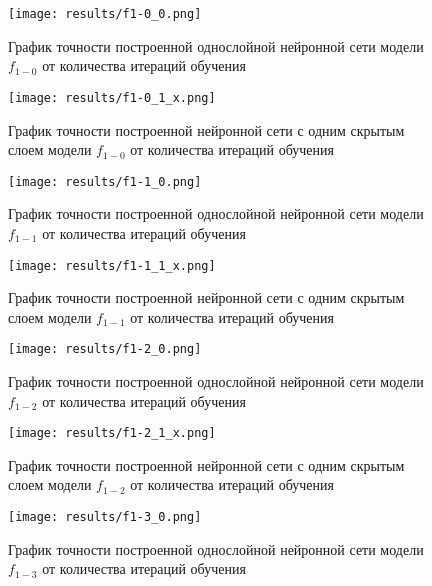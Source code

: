     \bigskip
  \begin{figure}[H]
  	\texttt{[image: results/f1-0\_0.png]}
  	
  	\caption{График точности построенной однослойной нейронной сети модели $f_{1-0}$ от количества итераций обучения}
  	
  \end{figure}
  
  \begin{figure}[H]
  	\texttt{[image: results/f1-0\_1\_x.png]}
  	
  	\caption{График точности построенной нейронной сети с одним скрытым слоем модели $f_{1-0}$  от количества итераций обучения}
  \end{figure}
  
    \begin{figure}[H]
  	\texttt{[image: results/f1-1\_0.png]}
  	
  	\caption{График точности построенной однослойной нейронной сети модели $f_{1-1}$ от количества итераций обучения}
  	
  \end{figure}
  
  \begin{figure}[H]
  	\texttt{[image: results/f1-1\_1\_x.png]}
  	
  	\caption{График точности построенной нейронной сети с одним скрытым слоем модели $f_{1-1}$  от количества итераций обучения}
  \end{figure}

  \begin{figure}[H]
	\texttt{[image: results/f1-2\_0.png]}
	
	\caption{График точности построенной однослойной нейронной сети модели $f_{1-2}$ от количества итераций обучения}
	
	\end{figure}

	\begin{figure}[H]
		\texttt{[image: results/f1-2\_1\_x.png]}
	
	\caption{График точности построенной нейронной сети с одним скрытым слоем модели $f_{1-2}$  от количества итераций обучения}
	\end{figure}
  
    \begin{figure}[H]
  	\texttt{[image: results/f1-3\_0.png]}
  	
  	\caption{График точности построенной однослойной нейронной сети модели $f_{1-3}$ от количества итераций обучения}
  	
  \end{figure}
  
